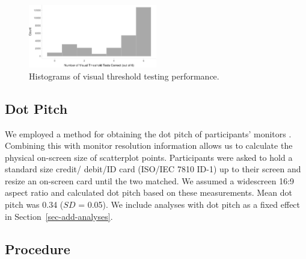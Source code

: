 \documentclass[manuscript, review, anonymous, screen]{acmart}
\begin{document}
\begin{figure}

\includegraphics[width=0.5\textwidth,height=\textheight]{size_and_contrast_new_files/figure-pdf/fig-VT-hist-1.pdf} \hfill{}

\caption{\label{fig-VT-hist}Histograms of visual threshold testing
performance.}

\end{figure}

\hypertarget{sec-dot-pitch}{%
\subsection{Dot Pitch}\label{sec-dot-pitch}}

We employed a method for obtaining the dot pitch of participants'
monitors \citep{screenscale}. Combining this with monitor resolution
information allows us to calculate the physical on-screen size of
scatterplot points. Participants were asked to hold a standard size
credit/ debit/ID card (ISO/IEC 7810 ID-1) up to their screen and resize
an on-screen card until the two matched. We assumed a widescreen 16:9
aspect ratio and calculated dot pitch based on these measurements. Mean
dot pitch was 0.34 (\(SD\) = 0.05). We include analyses with dot pitch
as a fixed effect in Section~\ref{sec-add-analyses}.

\hypertarget{sec-gen-procedure}{%
\subsection{Procedure}\label{sec-gen-procedure}}
\end{document}
